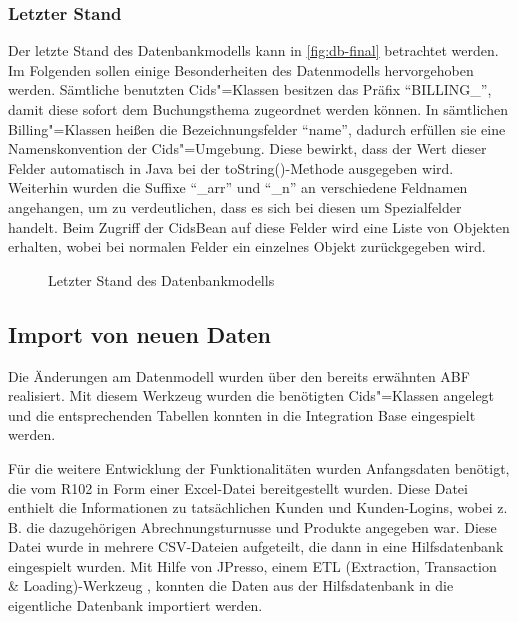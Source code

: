 \subsubsection{Letzter Stand}
Der letzte Stand des Datenbankmodells kann in \autoref{fig:db-final} betrachtet werden.
Im Folgenden sollen einige Besonderheiten des Datenmodells hervorgehoben werden.
Sämtliche benutzten Cids"=Klassen besitzen das Präfix "`BILLING\_"', damit diese sofort dem Buchungsthema zugeordnet werden können.
In sämtlichen Billing"=Klassen heißen die Bezeichnungsfelder "`name"', dadurch  erfüllen sie eine Namenskonvention der Cids"=Umgebung.
Diese bewirkt, dass der Wert dieser Felder automatisch in Java bei der toString()-Methode ausgegeben wird.
Weiterhin wurden die Suffixe \enquote{\_arr} und \enquote{\_n} an verschiedene Feldnamen angehangen, um zu verdeutlichen, dass es sich bei diesen um Spezialfelder handelt.
Beim Zugriff der CidsBean auf diese Felder wird eine Liste von Objekten erhalten, wobei bei normalen Felder ein einzelnes Objekt zurückgegeben wird.

\begin{sidewaysfigure}
	\centering
	\caption{Letzter Stand des Datenbankmodells}
	\label{fig:db-final}
\end{sidewaysfigure}

\subsection{Import von neuen Daten}
Die Änderungen am Datenmodell wurden über den bereits erwähnten \ac{ABF} realisiert.
Mit diesem Werkzeug wurden die benötigten Cids"=Klassen angelegt und die entsprechenden Tabellen konnten in die Integration Base eingespielt werden.

Für die weitere Entwicklung der Funktionalitäten wurden Anfangsdaten benötigt, die vom R102 in Form einer Excel-Datei bereitgestellt wurden.
Diese Datei enthielt die Informationen zu tatsächlichen Kunden und Kunden-Logins, wobei z.\,B. die dazugehörigen Abrechnungsturnusse und Produkte angegeben war.
Diese Datei wurde in mehrere \acs{CSV}-Dateien aufgeteilt, die dann in eine Hilfsdatenbank eingespielt wurden.
Mit Hilfe von JPresso, einem  ETL (Extraction, Transaction \& Loading)-Werkzeug \autocite[vgl.][]{cismet-jpresso}, konnten die Daten aus der Hilfsdatenbank in die eigentliche Datenbank importiert werden.

